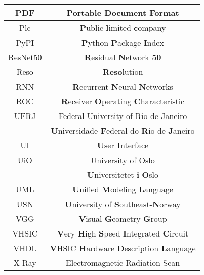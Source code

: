 \documentclass{article}
\begin{document}
\begin{center}
\begin{longtable}{ | c | c |}
 PDF & \textbf{P}ortable \textbf{D}ocument \textbf{F}ormat \\\hline
 Plc & \textbf{P}ublic \textbf{l}imited \textbf{c}ompany \\\hline
 PyPI & \textbf{P}ython \textbf{P}ackage \textbf{I}ndex \\\hline
 ResNet50 & \textbf{R}esidual \textbf{N}etwork \textbf{50} \\\hline
   Reso & \textbf{Reso}lution \\\hline
  
  RNN & \textbf{R}ecurrent \textbf{N}eural \textbf{N}etworks\\\hline
  ROC & \textbf{R}eceiver \textbf{O}perating \textbf{C}haracteristic\\\hline
 UFRJ & Federal University of Rio de Janeiro\\ &\textbf{U}niversidade \textbf{F}ederal do \textbf{R}io de \textbf{J}aneiro \\\hline
 UI & \textbf{U}ser \textbf{I}nterface \\\hline
  UiO &  University of Oslo\\ & \textbf{U}niversitetet \textbf{i} \textbf{O}slo \\\hline
   UML & \textbf{U}nified \textbf{M}odeling \textbf{L}anguage \\\hline
  USN & \textbf{U}niversity of \textbf{S}outheast-\textbf{N}orway \\\hline
  VGG & \textbf{V}isual \textbf{G}eometry \textbf{G}roup \\\hline

 VHSIC & \textbf{V}ery \textbf{H}igh \textbf{S}peed \textbf{I}ntegrated \textbf{C}ircuit \\\hline
 VHDL & \textbf{V}HSIC \textbf{H}ardware \textbf{D}escription \textbf{L}anguage\\\hline


 X-Ray & Electromagnetic Radiation Scan \\\hline






\end{longtable}


\end{center} 


 
\end{document}
